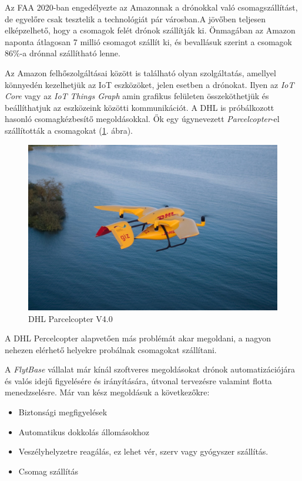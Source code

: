 Az FAA 2020-ban engedélyezte az Amazonnak a drónokkal való csomagszállítást, de egyelőre csak tesztelik a technológiát pár városban.A jövőben teljesen elképzelhető, hogy a csomagok felét drónok szállítják ki. Önmagában az Amazon naponta átlagosan 7 millió csomagot szállít ki, és bevallásuk szerint a csomagok 86\%-a drónnal szállítható lenne.

Az Amazon felhőszolgáltásai között is található olyan szolgáltatás, amellyel könnyedén kezelhetjük az IoT eszközöket, jelen esetben a drónokat.
Ilyen az \textit{IoT Core} vagy az \textit{IoT Things Graph} amin grafikus felületen összeköthetjük és beállíthatjuk az eszközeink közötti kommunikációt.
A DHL is próbálkozott hasonló csomagkézbesítő megoldásokkal. Ők egy úgynevezett  \textit{Parcelcopter}-el szállították a csomagokat (\ref{fig:parcelcopter}. ábra).

\begin{figure}[h]
    \centering
    \includegraphics[scale=1.0]{images/parcelcopter.jpeg}
    \caption{DHL Parcelcopter V4.0}
    \label{fig:parcelcopter}
\end{figure}

A DHL Percelcopter alapvetően más problémát akar megoldani, a nagyon nehezen elérhető helyekre probálnak csomagokat szállítani.

A \textit{FlytBase} \cite{flyt} vállalat már kínál szoftveres megoldásokat drónok automatizációjára és valós idejű figyelésére és irányítására, útvonal tervezésre valamint flotta menedzselésre.
Már van kész megoldásuk a következőkre:
\begin{itemize}
    \item Biztonsági megfigyelések
    \item Automatikus dokkolás állomásokhoz
    \item Veszélyhelyzetre reagálás, ez lehet vér, szerv vagy gyógyszer szállítás.
    \item Csomag szállítás
\end{itemize}

